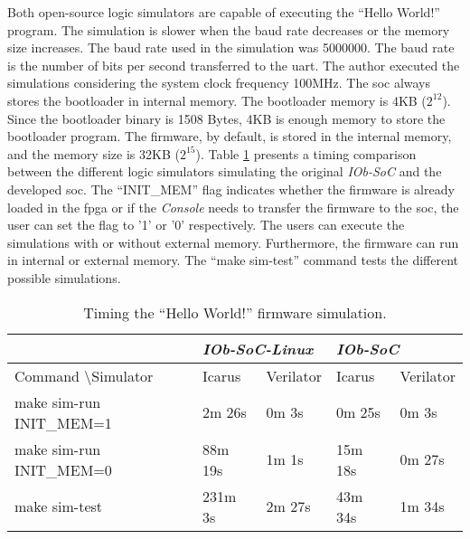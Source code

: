Both open-source logic simulators are capable of executing the \enquote{Hello World!} program. The simulation is slower when the baud rate decreases or the memory size increases. The baud rate used in the simulation was 5000000. The baud rate is the number of bits per second transferred to the \acrshort{uart}. The author executed the simulations considering the system clock frequency 100MHz. The \acrshort{soc} always stores the bootloader in internal memory. The bootloader memory is 4KB ($2^12$). Since the bootloader binary is 1508 Bytes, 4KB is enough memory to store the bootloader program. The firmware, by default, is stored in the internal memory, and the memory size is 32KB ($2^15$). Table \ref{tab:hello_sim} presents a timing comparison between the different logic simulators simulating the original \textit{IOb-SoC} and the developed \acrshort{soc}. The \enquote{INIT\_MEM} flag indicates whether the firmware is already loaded in the \acrshort{fpga} or if the \textit{Console} needs to transfer the firmware to the \acrshort{soc}, the user can set the flag to '1' or '0' respectively. The users can execute the simulations with or without external memory. Furthermore, the firmware can run in internal or external memory. The \enquote{make sim-test} command tests the different possible simulations.

\begin{table}[!ht]
    \centering
    \begin{tabular}{l|ll|ll|}
    \cline{2-5}
                                                           & \multicolumn{2}{l|}{\textit{IOb-SoC-Linux}} & \multicolumn{2}{l|}{\textit{IOb-SoC}}    \\ \hline
    \multicolumn{1}{|l|}{Command \textbackslash Simulator} & \multicolumn{1}{l|}{Icarus}  & Verilator & \multicolumn{1}{l|}{Icarus}  & Verilator \\ \hline
    \multicolumn{1}{|l|}{make sim-run INIT\_MEM=1}              & \multicolumn{1}{l|}{2m 26s}  & 0m 3s     & \multicolumn{1}{l|}{0m 25s}  & 0m 3s     \\ \hline
    \multicolumn{1}{|l|}{make sim-run INIT\_MEM=0}              & \multicolumn{1}{l|}{88m 19s} & 1m 1s     & \multicolumn{1}{l|}{15m 18s} & 0m 27s    \\ \hline
    \multicolumn{1}{|l|}{make sim-test}                         & \multicolumn{1}{l|}{231m 3s} & 2m 27s    & \multicolumn{1}{l|}{43m 34s} & 1m 34s    \\ \hline
    \end{tabular}
    \caption{Timing the \enquote{Hello World!} firmware simulation.}
    \label{tab:hello_sim}
\end{table}

